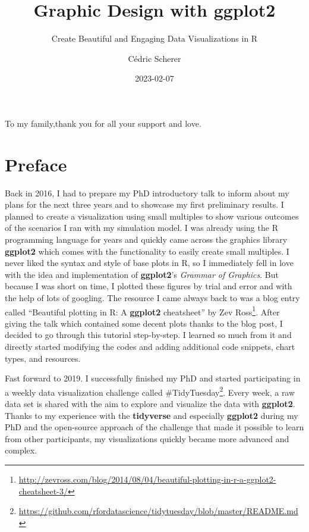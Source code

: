 \documentclass[
]{krantz}
\title{Graphic Design with ggplot2}
\subtitle{Create Beautiful and Engaging Data Visualizations in R}
\author{Cédric Scherer}
\date{2023-02-07}
\renewcommand{\href}[2]{#2\footnote{\url{#1}}}
\begin{document}
\maketitle


\thispagestyle{empty}

\begin{center}
To my family,thank you for all your support and love.
\end{center}

\setlength{\abovedisplayskip}{-5pt}
\setlength{\abovedisplayshortskip}{-5pt}

{
\hypersetup{linkcolor=}
\setcounter{tocdepth}{2}
\tableofcontents
}
\listoffigures
\listoftables
\hypertarget{preface}{%
\chapter*{Preface}\label{preface}}


Back in 2016, I had to prepare my PhD introductory talk to inform about my plans for the next three years and to showcase my first preliminary results. I planned to create a visualization using small multiples to show various outcomes of the scenarios I ran with my simulation model. I was already using the R programming language for years and quickly came across the graphics library \textbf{ggplot2} which comes with the functionality to easily create small multiples. I never liked the syntax and style of base plots in R, so I immediately fell in love with the idea and implementation of \textbf{ggplot2}'s \emph{Grammar of Graphics}. But because I was short on time, I plotted these figures by trial and error and with the help of lots of googling. The resource I came always back to was a blog entry called \href{http://zevross.com/blog/2014/08/04/beautiful-plotting-in-r-a-ggplot2-cheatsheet-3/}{``Beautiful plotting in R: A \textbf{ggplot2} cheatsheet'' by Zev Ross}. After giving the talk which contained some decent plots thanks to the blog post, I decided to go through this tutorial step-by-step. I learned so much from it and directly started modifying the codes and adding additional code snippets, chart types, and resources.

Fast forward to 2019. I successfully finished my PhD and started participating in a weekly data visualization challenge called \href{https://github.com/rfordatascience/tidytuesday/blob/master/README.md}{\#TidyTuesday}. Every week, a raw data set is shared with the aim to explore and visualize the data with \textbf{ggplot2}. Thanks to my experience with the \textbf{tidyverse} and especially \textbf{ggplot2} during my PhD and the open-source approach of the challenge that made it possible to learn from other participants, my visualizations quickly became more advanced and complex.
\end{document}
